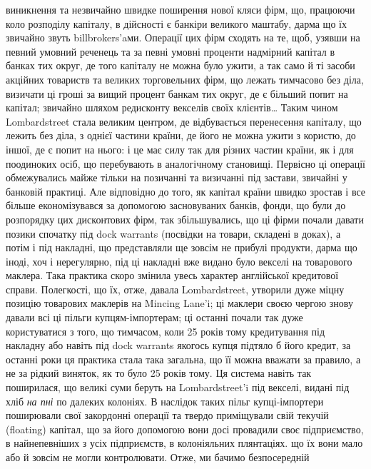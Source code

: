 \parcont{}  %
виникнення та незвичайно швидке поширення нової кляси фірм, що, працюючи
коло розподілу капіталу, в дійсності є банкіри великого маштабу, дарма що
їх звичайно звуть billbrokers’aми. Операції цих фірм сходять на те, щоб,
узявши на певний умовний реченець та за певні умовні проценти надмірний
капітал в банках тих округ, де того капіталу не можна було ужити, а так
само й ті засоби акційних товариств та великих торговельних фірм, що лежать
тимчасово без діла, визичати ці гроші за вищий процент банкам тих округ, де
є більший попит на капітал; звичайно шляхом редисконту векселів своїх клієнтів\dots{}
Таким чином Lombardstreet стала великим центром, де відбувається перенесення
капіталу, що лежить без діла, з однієї частини країни, де його не можна ужити
з користю, до іншої, де є попит на нього: і це має силу так для різних частин
країни, як і для поодиноких осіб, що перебувають в аналогічному становищі.
Первісно ці операції обмежувались майже тільки на позичанні та визичанні
під застави, звичайні у банковій практиці. Але відповідно до того, як капітал
країни швидко зростав і все більше економізувався за допомогою засновуваних
банків, фонди, що були до розпорядку цих дисконтових фірм, так збільшувались,
що ці фірми почали давати позики спочатку під dock warrants (посвідки
на товари, складені в доках), а потім і під накладні, що представляли ще
зовсім не прибулі продукти, дарма що іноді, хоч і нерегулярно, під ці накладні
вже видано було векселі на товарового маклера. Така практика скоро змінила
увесь характер англійської кредитової справи. Полегкості, що їх, отже, давала Lombardstreet,
утворили дуже міцну позицію товарових маклерів на Mincing Lane’i; ці
маклери своєю чергою знову давали всі ці пільги купцям-імпортерам; ці останні
почали так дуже користуватися з того, що тимчасом, коли 25 років тому кредитування
під накладну або навіть під dock warrants якогось купця підтяло б
його кредит, за останні роки ця практика стала така загальна, що її можна
вважати за правило, а не за рідкий виняток, як то було 25 років тому. Ця
система навіть так поширилася, що великі суми беруть на Lombardstreet’i під
векселі, видані під хліб \emph{на пні} по далеких колоніях. В наслідок таких пільг
купці-імпортери поширювали свої закордонні операції та твердо приміщували
свій текучій (floating) капітал, що за його допомогою вони досі провадили своє
підприємство, в найнепевніших з усіх підприємств, в колоніяльних плянтаціях.
що їх вони мало або й зовсім не могли контролювати. Отже, ми бачимо безпосередній
